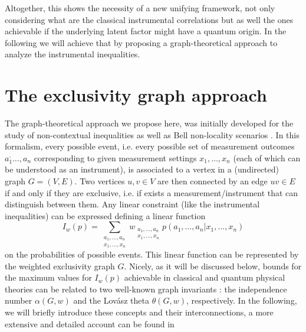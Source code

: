 \documentclass[letterpaper]{article}
\newcommand{\avg}[1]{\langle#1\rangle}
\begin{document}

Altogether, this shows the necessity of a new unifying framework, not only
considering what are the classical instrumental correlations but as well the
ones achievable if the underlying latent factor might have a quantum origin. In
the following we will achieve that by proposing a graph-theoretical approach to analyze the instrumental inequalities.


\section{The exclusivity graph approach}

The graph-theoretical approach we propose here, was initially developed for the
study of non-contextual inequalities \cite{cabello2014} as well as Bell
non-locality scenarios \cite{acin2015}. 
In this formalism, every possible event, i.e. every possible set of measurement
outcomes $a_1^,\ldots, a_n$ corresponding to given measurement settings
$x_1,\ldots,x_n$ (each of which can be understood as an instrument), is
associated to a vertex in a (undirected) graph $G = (V, E)$. Two vertices $u, v
\in V$ are then connected by an edge $uv \in E$ if and only if they are
exclusive, i.e.  if exists a measurement/instrument that can distinguish between
them. Any linear constraint (like the instrumental inequalities) can be
expressed defining a linear function
\begin{equation}
    I_w(p) = \sum_{\substack{a_1,\ldots,a_n\\x_1,\ldots,x_n}}
w_{\substack{a_1,\ldots,a_n\\x_1,\ldots,x_n}} p(a_1,\ldots,a_n|x_1,\ldots,x_n)
\end{equation}
on the probabilities of possible events. This linear function can be represented
by the weighted exclusivity graph $G$. Nicely, as it will be discussed below,
bounds for the maximum values for $ I_w(p)$ achievable in classical and quantum
physical theories can be related to two well-known graph invariants \cite{cabello2014}: the
independence number $\alpha(G, w)$ and the Lovász theta $\theta(G, w)$,
respectively. In the following, we will briefly introduce these concepts and
their interconnections, a more extensive and detailed account can be found in
\cite{cabello2014,rabelo2014,acin2015}
\end{document}
